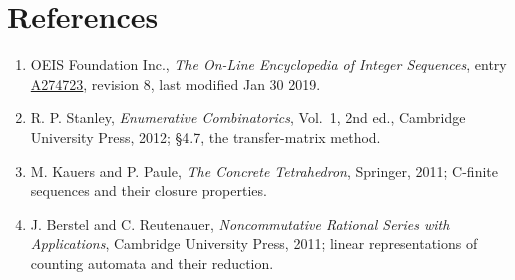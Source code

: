 \documentclass[11pt]{article}
\theoremstyle{definition}
\begin{document}
\section{References}

\begin{enumerate}

\item OEIS Foundation Inc., \emph{The On-Line Encyclopedia of Integer Sequences}, entry \href{https://oeis.org/A274723}{A274723}, revision 8, last modified Jan 30 2019.

\item R. P. Stanley, \emph{Enumerative Combinatorics}, Vol.~1, 2nd ed., Cambridge University Press, 2012; \S4.7, the transfer-matrix method.

\item M. Kauers and P. Paule, \emph{The Concrete Tetrahedron}, Springer, 2011; C-finite sequences and their closure properties.

\item J. Berstel and C. Reutenauer, \emph{Noncommutative Rational Series with Applications}, Cambridge University Press, 2011; linear representations of counting automata and their reduction.

\end{enumerate}
\end{document}
